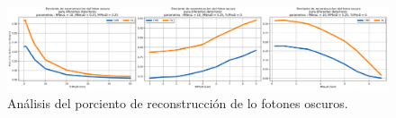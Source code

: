  
\begin{figure}[h!]
    \centering
    \includegraphics[width=1\textwidth]{Simulacion/imagenes/Porciento_fotones_oscuros.png}
    \caption{Análisis del porciento de reconstrucción de lo fotones oscuros.}
    \label{}
\end{figure}


 
 
 
 